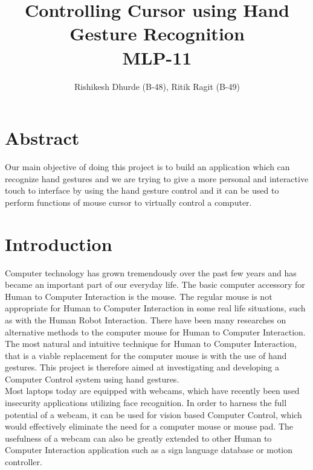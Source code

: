 \documentclass[12pt]{article}
\title{Controlling Cursor using Hand Gesture Recognition\\MLP-11}
\author{Rishikesh Dhurde (B-48), Ritik Ragit (B-49)}
\begin{document}
\maketitle
\section{Abstract}
Our main objective of doing this project is to build an application which can recognize hand gestures and we are trying to give a more personal and interactive touch to interface by using the hand gesture control and it can be used to perform functions of mouse cursor to virtually control a computer.

\section{Introduction}
Computer technology has grown tremendously over the past few years and has became an important part of our everyday life. The basic computer accessory for Human to Computer Interaction is the mouse. The regular mouse is not appropriate for Human to Computer Interaction in some real life situations, such as with the Human Robot Interaction. There have been many researches on alternative methods to the computer mouse for Human to Computer Interaction. The most natural and intuitive technique for Human to Computer Interaction, that is a viable replacement for the computer mouse is with the use of hand gestures. This project is therefore aimed at investigating and developing a Computer Control system using hand gestures.
\\
Most laptops today are equipped with webcams, which have recently been used insecurity applications utilizing face recognition. In order to harness the full potential of a webcam, it can be used for vision based Computer Control, which would effectively eliminate the need for a computer mouse or mouse pad. The usefulness of a webcam can also be greatly extended to other Human to Computer Interaction application such as a sign language database or motion controller.\cite{2}
\end{document}
